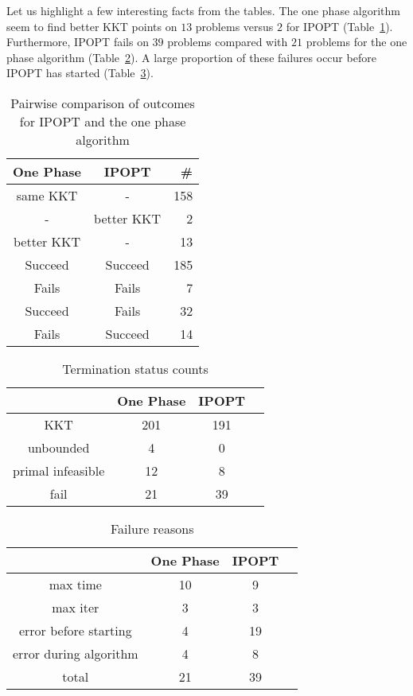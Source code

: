 \documentclass{article}
\begin{document}
Let us highlight a few interesting facts from the tables. The one phase algorithm seem to find better KKT points on $13$ problems versus $2$ for IPOPT (Table~\ref{tbl:pairwise-outcomes}). Furthermore, IPOPT fails on $39$ problems compared with $21$ problems for the one phase algorithm (Table~\ref{tbl:termination-status-counts}). A large proportion of these failures occur before IPOPT has started (Table~\ref{tbl:failure-reasons}).

\begin{table}[H]
\caption{Pairwise comparison of outcomes for IPOPT and the one phase algorithm}\label{tbl:pairwise-outcomes}
\begin{tabular}{ c c r }
  One Phase &  IPOPT &  \# \\
  \hline
same KKT & - & 158  \\
- & better KKT & 2 \\
better KKT & - &  13 \\
\hline
Succeed & Succeed & 185 \\
Fails & Fails & 7 \\
Succeed & Fails &  32 \\
Fails & Succeed & 14 \\
\end{tabular}
\end{table}


\begin{table}[H]
\caption{Termination status counts}\label{tbl:termination-status-counts}
\begin{tabular}{ c c c r }
 &  One Phase &  IPOPT &  \\
  \hline
KKT &  201 & 191 \\
unbounded & 4 & 0  \\
primal infeasible & 12 &  8 \\
fail & 21 & 39 \\
\end{tabular}
\end{table}

\begin{table}[H]
\caption{Failure reasons}\label{tbl:failure-reasons}
\begin{tabular}{ c c c r }
 &  One Phase & IPOPT \\
  \hline
max time & 10 & 9  \\
max iter &  3 & 3 \\
error before starting & 4 & 19 \\
error during algorithm & 4 & 8 \\
\hline
total & 21 & 39
\end{tabular}
\end{table}
\end{document}
